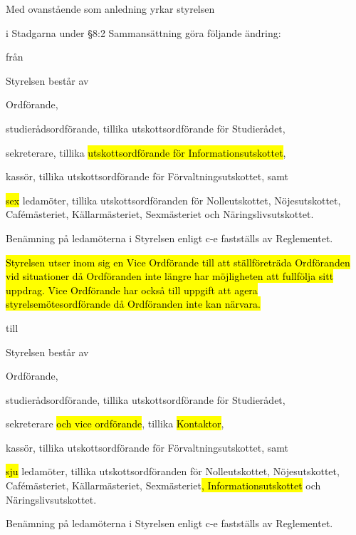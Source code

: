 \documentclass[../_main/handlingar.tex]{subfiles}
\begin{document}
Med ovanstående som anledning yrkar styrelsen
\begin{attsatser}
    
    \att i Stadgarna under §8:2 Sammansättning göra följande ändring:

    från

    Styrelsen består av
    \begin{alphlist}
    \item Ordförande,
    \item studierådsordförande, tillika utskottsordförande för Studierådet,
    \item sekreterare, tillika \hl{utskottsordförande för Informationsutskottet},
    \item kassör, tillika utskottsordförande för Förvaltningsutskottet, samt
    \item \hl{sex} ledamöter, tillika utskottsordföranden för Nolleutskottet,
        Nöjesutskottet, Cafémästeriet, Källarmästeriet, Sexmästeriet och
        Näringslivsutskottet.
    \end{alphlist}
    
    Benämning på ledamöterna i Styrelsen enligt c-e fastställs av Reglementet.
    
    \hl{Styrelsen utser inom sig en Vice Ordförande till att ställföreträda Ordföranden vid situationer då Ordföranden inte längre har möjligheten att fullfölja sitt uppdrag. Vice Ordförande har också till uppgift att agera styrelsemötesordförande då Ordföranden inte kan närvara.}
    
    till

    Styrelsen består av
    \begin{alphlist}
    \item Ordförande,
    \item studierådsordförande, tillika utskottsordförande för Studierådet,
    \item sekreterare \hl{och vice ordförande}, tillika \hl{Kontaktor},
    \item kassör, tillika utskottsordförande för Förvaltningsutskottet, samt
    \item \hl{sju} ledamöter, tillika utskottsordföranden för Nolleutskottet,
        Nöjesutskottet, Cafémästeriet, Källarmästeriet, Sexmästeriet\hl{, Informationsutskottet} och
        Näringslivsutskottet.
    \end{alphlist}
    
    Benämning på ledamöterna i Styrelsen enligt c-e fastställs av Reglementet.
    

\end{attsatser}
\end{document}
